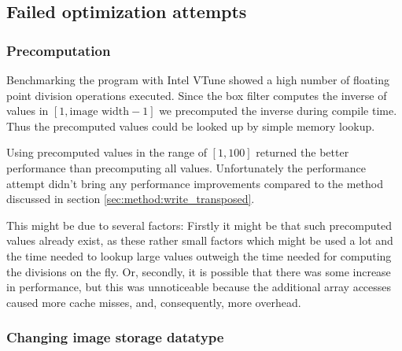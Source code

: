 \subsection{Failed optimization attempts}

\subsubsection{Precomputation} 

Benchmarking the program with Intel VTune showed a high number of floating point division operations executed. Since the box filter computes the inverse of values in $[1,\text{image width}-1]$ we precomputed the inverse during compile time. Thus the precomputed values could be looked up by simple memory lookup. 

Using precomputed values in the range of $[1,100]$ returned the better performance than precomputing all values. Unfortunately the performance attempt didn't bring any performance improvements compared to the method discussed in section \ref{sec:method:write_transposed}.

%
%

This might be due to several factors:
Firstly it might be that such precomputed values already exist, as these rather small factors which might be used a lot and the time needed to lookup large values outweigh the time needed for computing the divisions on the fly. Or, secondly, it is possible that there was some increase in performance, but this was unnoticeable because the additional array accesses caused more cache misses, and, consequently, more overhead.

\subsubsection{Changing image storage datatype}


